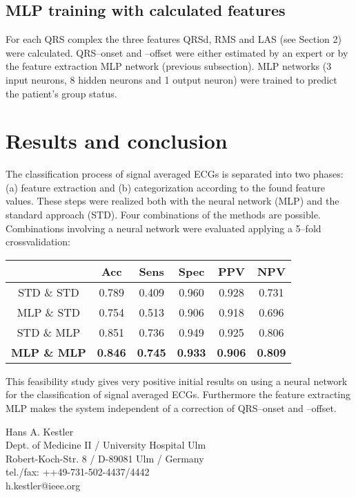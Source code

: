 \documentclass[twocolumn]{cinc}
\begin{document}
\subsection{MLP training with calculated features}

For each QRS complex the three features QRSd, RMS and LAS (see Section 2) were calculated.
QRS--onset and --offset were either estimated by an expert or by the feature extraction MLP
network (previous subsection). MLP networks (3 input neurons, 8 hidden neurons and 1 output
neuron) were trained to predict the patient's group status.




\vspace*{-2mm}
\section{Results and conclusion}

The classification process of signal averaged ECGs is separated into two phases: (a) feature extraction
and (b) categorization according to the found feature values. These steps were realized both with the
neural network (MLP) and the standard approach (STD). Four combinations of the methods are possible.
Combinations involving a neural network were evaluated applying a 5--fold crossvalidation:
\begin{center}
\small
\begin{tabular}{|c||c|c|c|c|c|}\hline
           & Acc  & Sens & Spec & PPV   & NPV   \\ \hline \hline
STD \& STD & 0.789     & 0.409       & 0.960       & 0.928 & 0.731 \\ \hline
MLP \& STD & 0.754     & 0.513       & 0.906       & 0.918 & 0.696 \\ \hline
STD \& MLP & 0.851     & 0.736       & 0.949       & 0.925 & 0.806 \\ \hline 
{\bf MLP \& MLP} & {\bf 0.846}     &{\bf 0.745}       & {\bf 0.933}       & {\bf 0.906} & {\bf 0.809}\\ \hline
\end{tabular}
\end{center}
{ This feasibility study gives very positive initial results on using a neural
network for the classification of signal averaged ECGs. Furthermore the feature extracting MLP
makes the system independent of a correction of QRS--onset and --offset.}


\vspace*{-2mm}


\begin{correspondence}
Hans A. Kestler\\
Dept. of Medicine II / University Hospital Ulm\\
Robert-Koch-Str. 8 / D-89081 Ulm / Germany\\
tel./fax: ++49-731-502-4437/4442\\
h.kestler@ieee.org
\end{correspondence}
\end{document}
